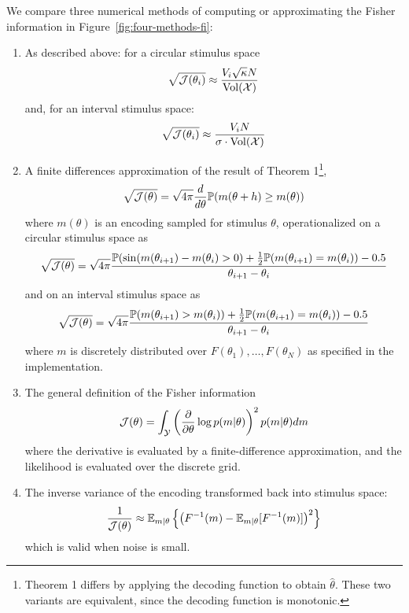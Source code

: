 We compare three numerical methods of computing or approximating the Fisher information in Figure~\ref{fig:four-methods-fi}:
\begin{enumerate}
\item As described above: for a circular stimulus space
\begin{equation}
  \sqrt{\mathcal{J}(\theta_i)} \approx  \frac{V_i \sqrt{\kappa} N}{\operatorname{Vol}(\mathcal{X})}
\end{equation}
and, for an interval stimulus space:
\begin{equation}
    \sqrt{\mathcal{J}(\theta_i)} \approx  \frac{V_i N}{\sigma \cdot \operatorname{Vol}(\mathcal{X})}
\end{equation}
\item A finite differences approximation of the result of Theorem 1\footnote{Theorem 1 differs by applying the decoding function to obtain $\widehat{\theta}$. These two variants are equivalent, since the decoding function is monotonic.},
\begin{equation}
    \sqrt{\mathcal{J}(\theta)} = \sqrt{4\pi} \frac{d}{d\theta} \mathbb{P}(m(\theta+h) \geq m(\theta))
\end{equation}
where $m(\theta)$ is an encoding sampled for stimulus $\theta$, operationalized on a circular stimulus space as
\begin{equation}
    \sqrt{\mathcal{J}(\theta)} = \sqrt{4\pi} \frac{\mathbb{P}(\sin(m(\theta_{i+1})- m(\theta_i) > 0) + \frac{1}{2}\mathbb{P}(m(\theta_{i+1}) = m(\theta_i)) - 0.5}{\theta_{i+1}-\theta_i}
\end{equation}
and on an interval stimulus space as
\begin{equation}
    \sqrt{\mathcal{J}(\theta)} = \sqrt{4\pi} \frac{\mathbb{P}(m(\theta_{i+1}) > m(\theta_i)) + \frac{1}{2}\mathbb{P}(m(\theta_{i+1}) = m(\theta_i)) - 0.5}{\theta_{i+1}-\theta_i}
\end{equation}
where $m$ is discretely distributed over $F(\theta_1), \dots, F(\theta_N)$ as specified in the implementation.

\item The general definition of the Fisher information
\begin{equation}
    \mathcal{J}(\theta) = \int_{\mathcal{Y}} \left(\frac{\partial}{\partial \theta} \log p(m | \theta)\right)^2 p(m|\theta) dm
\end{equation}
where the derivative is evaluated by a finite-difference approximation, and the likelihood is evaluated over the discrete grid.

\item The inverse variance of the encoding transformed back into stimulus space:
\begin{equation}
    \frac{1}{\mathcal{J}(\theta)} \approx \mathbb{E}_{m|\theta} \left\{\left(F^{-1}(m) - \mathbb{E}_{m|\theta}[F^{-1}(m)]\right)^2\right\}
\end{equation}
which is valid when noise is small.
\end{enumerate}
